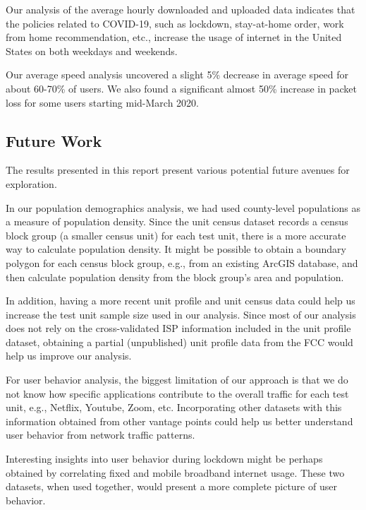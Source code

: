 \documentclass[conference,10pt]{IEEEtran}
\begin{document}
Our analysis of the average hourly downloaded and uploaded data indicates that the policies related to COVID-19, such as lockdown, stay-at-home order, work from home recommendation, etc., increase the usage of internet in the United States on both weekdays and weekends.

Our average speed analysis uncovered a slight 5\% decrease in average speed for about 60-70\% of users. We also found a significant almost 50\% increase in packet loss for some users starting mid-March 2020.

\subsection{Future Work}
\label{sec:future-work}

The results presented in this report present various potential future avenues for exploration.

In our population demographics analysis, we had used county-level populations as a measure of population density. Since the unit census dataset records a census block group (a smaller census unit) for each test unit, there is a more accurate way to calculate population density. It might be possible to obtain a boundary polygon for each census block group, e.g., from an existing ArcGIS database, and then calculate population density from the block group's area and population.

In addition, having a more recent unit profile and unit census data could help us increase the test unit sample size used in our analysis. Since most of our analysis does not rely on the cross-validated ISP information included in the unit profile dataset, obtaining a partial (unpublished) unit profile data from the FCC would help us improve our analysis.

For user behavior analysis, the biggest limitation of our approach is that we do not know how specific applications contribute to the overall traffic for each test unit, e.g., Netflix, Youtube, Zoom, etc. Incorporating other datasets with this information obtained from other vantage points could help us better understand user behavior from network traffic patterns.

Interesting insights into user behavior during lockdown might be perhaps obtained by correlating fixed and mobile broadband internet usage. These two datasets, when used together, would present a more complete picture of user behavior.
\end{document}

